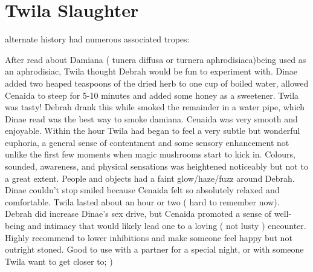 \documentclass[12pt]{book}
\begin{document}
\chapter{Twila Slaughter}

alternate history had numerous associated tropes:



After read about Damiana ( tunera diffusa or turnera aphrodisiaca)being used as an aphrodisiac, Twila thought Debrah would be fun to experiment with. Dinae added two heaped teaspoons of the dried herb to one cup of boiled water, allowed Cenaida to steep for 5-10 minutes and added some honey as a sweetener. Twila was tasty! Debrah drank this while smoked the remainder in a water pipe, which Dinae read was the best way to smoke damiana. Cenaida was very smooth and enjoyable. Within the hour Twila had began to feel a very subtle but wonderful euphoria, a general sense of contentment and some sensory enhancement not unlike the first few moments when magic mushrooms start to kick in. Colours, sounded, awareness, and physical sensations was heightened noticeably but not to a great extent. People and objects had a faint glow/haze/fuzz around Debrah. Dinae couldn't stop smiled because Cenaida felt so absolutely relaxed and comfortable. Twila lasted about an hour or two ( hard to remember now). Debrah did increase Dinae's sex drive, but Cenaida promoted a sense of well-being and intimacy that would likely lead one to a loving ( not lusty ) encounter. Highly recommend to lower inhibitions and make someone feel happy but not outright stoned. Good to use with a partner for a special night, or with someone Twila want to get closer to; )
\end{document}
